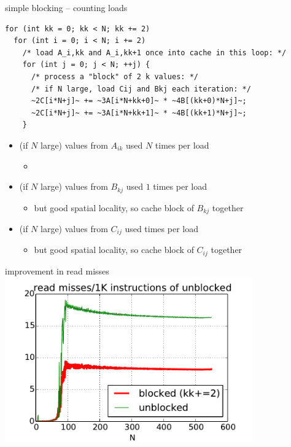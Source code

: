 \begin{frame}[fragile,label=cacheBlockKLoads]{simple blocking -- counting loads}
\begin{lstlisting}
for (int kk = 0; kk < N; kk += 2)
  for (int i = 0; i < N; i += 2)
    /* load A_i,kk and A_i,kk+1 once into cache in this loop: */
    for (int j = 0; j < N; ++j) {
      /* process a "block" of 2 k values: */
      /* if N large, load Cij and Bkj each iteration: */
      ~2C[i*N+j]~ += ~3A[i*N+kk+0]~ * ~4B[(kk+0)*N+j]~;
      ~2C[i*N+j]~ += ~3A[i*N+kk+1]~ * ~4B[(kk+1)*N+j]~;
    }
\end{lstlisting}
\begin{itemize}
\item (if $N$ large) values from $A_{ik}$ used $N$ times per load
    \begin{itemize}
    \item {}
    \end{itemize}
\item (if $N$ large) values from $B_{kj}$ used $1$ times per load
    \begin{itemize}
    \item but good spatial locality, so cache block of $B_{kj}$ together
    \end{itemize}
\item (if $N$ large) values from $C_{ij}$ used  times per load
    \begin{itemize}
    \item but good spatial locality, so cache block of $C_{ij}$ together
    \end{itemize}
\end{itemize}
\end{frame}

\begin{frame}{improvement in read misses}
\includegraphics[width=0.8\textwidth]{../caching/k-kk-novec-block-read_miss_rate}
\end{frame}

